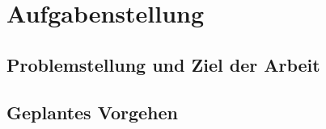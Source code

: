 \chapter{Aufgabenstellung}
\label{chap:Aufgabenstellung}

\section{Problemstellung und Ziel der Arbeit}

\section{Geplantes Vorgehen}